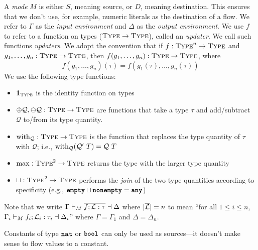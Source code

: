 \documentclass[nonacm, dvipsnames, sigconf]{acmart}
\begin{document}
A \emph{mode} $M$ is either $S$, meaning source, or $D$, meaning destination.
This ensures that we don't use, for example, numeric literals as the destination of a flow.
We refer to $\Gamma$ as the \emph{input environment} and $\Delta$ as the \emph{output environment}.
We use $f$ to refer to a function on types ($\types \to \types$), called an \emph{updater}.
We call such functions \emph{updaters}.
We adopt the convention that if $f : \types^n \to \types$ and $g_1,\ldots,g_n : \types \to \types$, then $f(g_1, \ldots, g_n) : \types \to \types$, where
\[
    f(g_1, \ldots, g_n)(\tau) = f(g_1(\tau), \ldots, g_n(\tau))
\]
We use the following type functions:
\begin{itemize}
    \item $\id{\types}$ is the identity function on types
    \item $\oplus \mathcal{Q}, \ominus \mathcal{Q} : \types \to \types$ are functions that take a type $\tau$ and add/subtract $\mathcal{Q}$ to/from its type quantity.
    \item $\with_{\mathcal{Q}} : \types \to \types$ is the function that replaces the type quantity of $\tau$ with $\mathcal{Q}$; i.e., $\with_{\mathcal{Q}}(\mathcal{Q}'~T) = \mathcal{Q}~T$
    \item $\max : \types^2 \to \types$ returns the type with the larger type quantity
    \item $\sqcup : \types^2 \to \types$ performs the \emph{join} of the two type quantities according to specificity (e.g., $\emptyq \sqcup \nonempty = \any$)
\end{itemize}


Note that we write $\Gamma \flowproves_M \overline{f ; \Loc : \tau} \flowprovesout \Delta$ where $|\overline{\Loc}| = n$ to mean
``for all $1 \leq i \leq n$, $\Gamma_i \flowproves_M f_i ; \Loc_i : \tau_i \flowprovesout \Delta_i$'' where $\Gamma = \Gamma_1$ and $\Delta = \Delta_n$.

Constants of type $\natt$ or $\boolt$ can only be used as sources---it doesn't make sense to flow values to a constant.
\begin{mathpar}

\end{mathpar}
\end{document}

